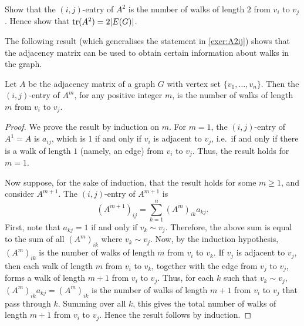 \begin{Exercise}\label{exer:A2ij}
Show that the $(i,j)$-entry of $A^2$ is the number of walks of length $2$ from $v_i$ to $v_j$. Hence show that $\trace(A^2) = 2|E(G)|$.\\
\end{Exercise}

The following result (which generalises the statement in \cref{exer:A2ij}) shows that the adjacency matrix can be used to obtain certain information about walks in the graph.

\begin{Theorem}
Let $A$ be the adjacency matrix of a graph $G$ with vertex set $\{v_1, \ldots, v_n\}$. Then the $(i,j)$-entry of $A^m$, for any positive integer $m$, is the number of walks of length $m$ from $v_i$ to $v_j$.
\end{Theorem}

\begin{proof}
We prove the result by induction on $m$. For $m = 1$, the $(i,j)$-entry of $A^1 = A$ is $a_{ij}$, which is $1$ if and only if $v_i$ is adjacent to $v_j$, i.e.\ if and only if there is a walk of length $1$ (namely, an edge) from $v_i$ to $v_j$. Thus, the result holds for $m = 1$.

Now suppose, for the sake of induction, that the result holds for some $m \ge 1$, and consider $A^{m + 1}$. The $(i,j)$-entry of $A^{m + 1}$ is
\begin{equation*}
(A^{m + 1})_{ij} = \sum_{k = 1}^{n} (A^m)_{ik} a_{kj}.
\end{equation*}
First, note that $a_{kj} = 1$ if and only if $v_k \sim v_j$. Therefore, the above sum is equal to the sum of all $(A^m)_{ik}$ where $v_k \sim v_j$. Now, by the induction hypothesis, $(A^m)_{ik}$ is the number of walks of length $m$ from $v_i$ to $v_k$. If $v_j$ is adjacent to $v_j$, then each walk of length $m$ from $v_i$ to $v_k$, together with the edge from $v_j$ to $v_j$, forms a walk of length $m + 1$ from $v_i$ to $v_j$. Thus, for each $k$ such that $v_k \sim v_j$, $(A^m)_{ik} a_{kj} = (A^m)_{ik}$ is the number of walks of length $m + 1$ from $v_i$ to $v_j$ that pass through $k$. Summing over all $k$, this gives the total number of walks of length $m + 1$ from $v_i$ to $v_j$. Hence the result follows by induction.
\end{proof}

